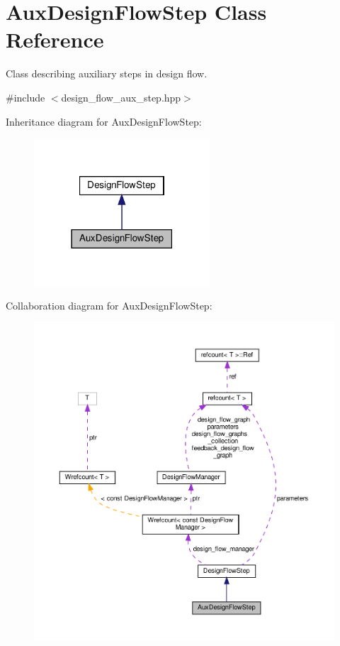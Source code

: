 \hypertarget{classAuxDesignFlowStep}{}\section{Aux\+Design\+Flow\+Step Class Reference}
\label{classAuxDesignFlowStep}


Class describing auxiliary steps in design flow.  




{\ttfamily \#include $<$design\+\_\+flow\+\_\+aux\+\_\+step.\+hpp$>$}



Inheritance diagram for Aux\+Design\+Flow\+Step\+:
\nopagebreak
\begin{figure}[H]
\begin{center}
\leavevmode
\includegraphics[width=186pt]{db/d55/classAuxDesignFlowStep__inherit__graph}
\end{center}
\end{figure}


Collaboration diagram for Aux\+Design\+Flow\+Step\+:
\nopagebreak
\begin{figure}[H]
\begin{center}
\leavevmode
\includegraphics[width=350pt]{df/d1a/classAuxDesignFlowStep__coll__graph}
\end{center}
\end{figure}

